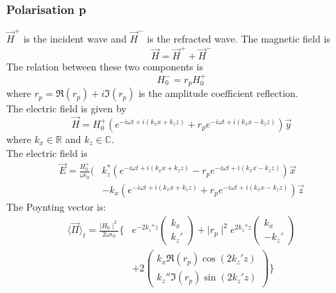 \subsubsection{Polarisation p}
$\vec{H}^+$ is the incident wave and $\vec{H}^-$ is the refracted wave. The magnetic field is
\begin{equation*}
\vec{H}=\vec{H}^++\vec{H}^-
\end{equation*}
The relation between these two components is
\begin{equation*}
H^-_0=r_pH^+_0
\end{equation*}
where $r_p=\Re(r_p)+i\Im(r_p)$ is the amplitude coefficient reflection.\\
The electric field is given by $$\vec{H}=H^+_0(e^{-i\omega t+i(k_xx+k_zz)}+r_pe^{-i\omega t+i(k_xx-k_zz)})\vec{y}$$
where $k_x\in \mathbb{R}$ and $k_z\in \mathbb{C}$.\\
The electric field is\\
\begin{align*}
\vec{E}=\frac{H^{+}_0}{\omega \epsilon _0}(&k_z^*(e^{-i\omega t+i(k_xx+k_zz)}-r_pe^{-i\omega t+i(k_xx-k_zz)})\vec{x}\\
&-k_x(e^{-i\omega t+i(k_xx+k_zz)}+r_pe^{-i\omega t+i(k_xx-k_zz)})\vec{z}
\end{align*}
The Poynting vector is:\\
\begin{align*}
\langle \vec{\Pi} \rangle _t= \displaystyle\frac{\displaystyle \mid H_0\mid ^2}{\displaystyle 2\omega \epsilon _0}\Big\{&
e^{-2k_z''z}
\begin{pmatrix}
k_x\\
k_z'
\end{pmatrix}
+\mid r_p\mid ^2e^{2k_z''z}
\begin{pmatrix}
k_x\\
-k_z'
\end{pmatrix}\\
&+2
\begin{pmatrix}
k_x\Re(r_p)\cos(2k_z'z)\\
k_z''\Im(r_p)\sin(2k_z'z)
\end{pmatrix}
\Big\}
\end{align*}
